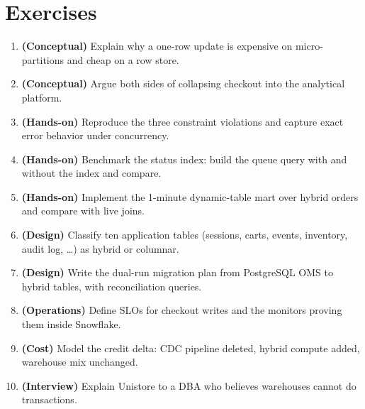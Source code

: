 \section{Exercises}
\begin{enumerate}
    \item \textbf{(Conceptual)} Explain why a one-row update is expensive on micro-partitions and cheap on a row store.
    \item \textbf{(Conceptual)} Argue both sides of collapsing checkout into the analytical platform.
    \item \textbf{(Hands-on)} Reproduce the three constraint violations and capture exact error behavior under concurrency.
    \item \textbf{(Hands-on)} Benchmark the status index: build the queue query with and without the index and compare.
    \item \textbf{(Hands-on)} Implement the 1-minute dynamic-table mart over hybrid orders and compare with live joins.
    \item \textbf{(Design)} Classify ten application tables (sessions, carts, events, inventory, audit log, \ldots) as hybrid or columnar.
    \item \textbf{(Design)} Write the dual-run migration plan from PostgreSQL OMS to hybrid tables, with reconciliation queries.
    \item \textbf{(Operations)} Define SLOs for checkout writes and the monitors proving them inside Snowflake.
    \item \textbf{(Cost)} Model the credit delta: CDC pipeline deleted, hybrid compute added, warehouse mix unchanged.
    \item \textbf{(Interview)} Explain Unistore to a DBA who believes warehouses cannot do transactions.
\end{enumerate}
